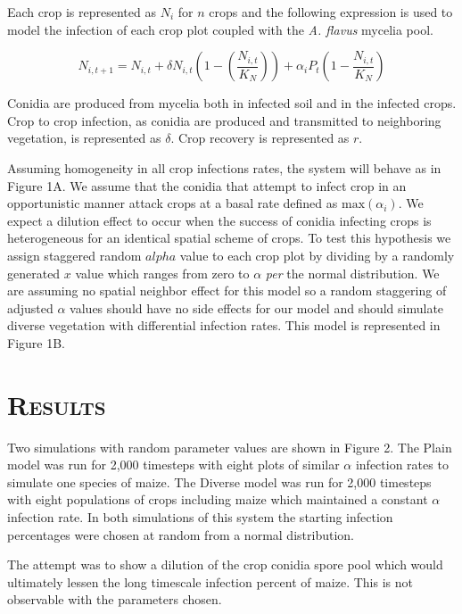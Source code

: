 \documentclass[a4paper,12pt]{article}
\begin{document}
Each crop is represented as $N_{i}$ for $n$ crops and the following expression is used to model the infection of each crop plot coupled with the \emph{A. flavus} mycelia pool.

$$N_{i,t + 1} = N_{i,t} + \delta N_{i,t} \left(1 - \left(\frac{N_{i,t}}{K_{N}}\right)\right) + \alpha_{i}P_{t} \left(1 - \frac{N_{i,t}}{K_{N}}\right)$$

\noindent
Conidia are produced from mycelia both in infected soil and in the infected crops.
Crop to crop infection, as conidia are produced and transmitted to neighboring vegetation, is represented as $\delta$.
Crop recovery is represented as $r$.

Assuming homogeneity in all crop infections rates, the system will behave as in Figure 1A.
We assume that the conidia that attempt to infect crop in an opportunistic manner attack crops at a basal rate defined as $\textrm{max}\left(\alpha_{i}\right)$.
We expect a dilution effect to occur when the success of conidia infecting crops is heterogeneous for an identical spatial scheme of crops.
To test this hypothesis we assign staggered random $alpha$ value to each crop plot by dividing by a randomly generated $x$ value which ranges from zero to $\alpha$ \emph{per} the normal distribution.
We are assuming no spatial neighbor effect for this model so a random staggering of adjusted $\alpha$ values should have no side effects for our model and should simulate diverse vegetation with differential infection rates.
This model is represented in Figure 1B.


\section*{\upshape\textsc{Results}}

Two simulations with random parameter values are shown in Figure 2.
The Plain model was run for 2,000 timesteps with eight plots of similar $\alpha$ infection rates to simulate one species of maize.
The Diverse model was run for 2,000 timesteps with eight populations of crops including maize which maintained a constant $\alpha$ infection rate.
In both simulations of this system the starting infection percentages were chosen at random from a normal distribution.

The attempt was to show a dilution of the crop conidia spore pool which would ultimately lessen the long timescale infection percent of maize.
This is not observable with the parameters chosen.
\end{document}
